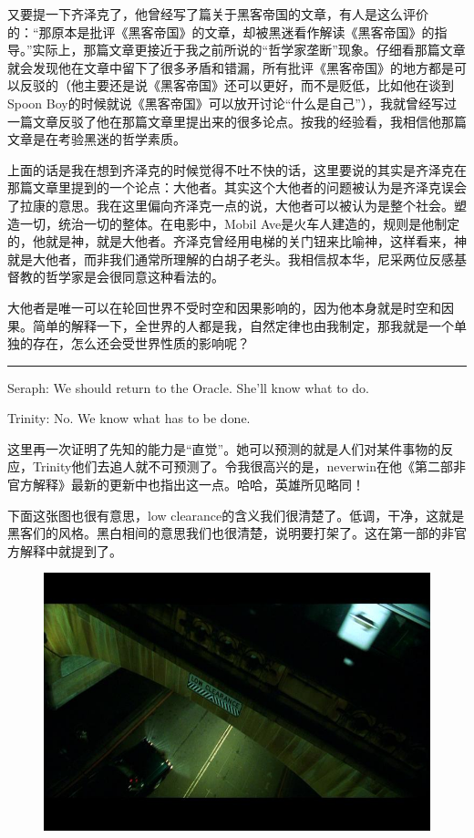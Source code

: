 \documentclass[UTF8]{ctexart}
\newcommand{\myparsep}{\noindent \rule[0.5ex]{\linewidth}{1pt}}
\newenvironment{myquote}{\color{green} \setlength{\leftskip}{6em} \setlength{\rightskip}{4em} \setlength{\parindent}{-2em}}{\par}
\begin{document}
又要提一下齐泽克了，他曾经写了篇关于黑客帝国的文章，有人是这么评价的：“那原本是批评《黑客帝国》的文章，却被黑迷看作解读《黑客帝国》的指导。”实际上，那篇文章更接近于我之前所说的“哲学家垄断”现象。仔细看那篇文章就会发现他在文章中留下了很多矛盾和错漏，所有批评《黑客帝国》的地方都是可以反驳的（他主要还是说《黑客帝国》还可以更好，而不是贬低，比如他在谈到Spoon Boy的时候就说《黑客帝国》可以放开讨论“什么是自己”），我就曾经写过一篇文章反驳了他在那篇文章里提出来的很多论点。按我的经验看，我相信他那篇文章是在考验黑迷的哲学素质。

上面的话是我在想到齐泽克的时候觉得不吐不快的话，这里要说的其实是齐泽克在那篇文章里提到的一个论点：大他者。其实这个大他者的问题被认为是齐泽克误会了拉康的意思。我在这里偏向齐泽克一点的说，大他者可以被认为是整个社会。塑造一切，统治一切的整体。在电影中，Mobil Ave是火车人建造的，规则是他制定的，他就是神，就是大他者。齐泽克曾经用电梯的关门钮来比喻神，这样看来，神就是大他者，而非我们通常所理解的白胡子老头。我相信叔本华，尼采两位反感基督教的哲学家是会很同意这种看法的。

大他者是唯一可以在轮回世界不受时空和因果影响的，因为他本身就是时空和因果。简单的解释一下，全世界的人都是我，自然定律也由我制定，那我就是一个单独的存在，怎么还会受世界性质的影响呢？

\myparsep

\begin{myquote}
Seraph: We should return to the Oracle. She'll know what to do.

Trinity: No. We know what has to be done.
\end{myquote}

这里再一次证明了先知的能力是“直觉”。她可以预测的就是人们对某件事物的反应，Trinity他们去追人就不可预测了。令我很高兴的是，neverwin在他《第二部非官方解释》最新的更新中也指出这一点。哈哈，英雄所见略同！

下面这张图也很有意思，low clearance的含义我们很清楚了。低调，干净，这就是黑客们的风格。黑白相间的意思我们也很清楚，说明要打架了。这在第一部的非官方解释中就提到了。

\begin{figure}[htb]
\centering
\includegraphics[width=0.5\linewidth]{fig/8b758b82f42f6090f603a6f5.jpg}
\end{figure}
\end{document}
